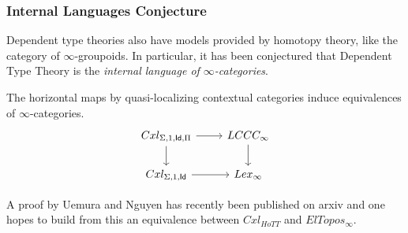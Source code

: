 \documentclass{beamer}
\DeclareMathOperator{\Id}{\mathsf{Id}}
\begin{document}
\begin{frame}
  \frametitle{Internal Languages Conjecture}

  Dependent type theories also have models provided by homotopy theory, like
  the category of $\infty$-groupoids. In
  particular, it has been conjectured that Dependent Type Theory is the
  \emph{internal language of $\infty$-categories}.

  \begin{conj}
    The horizontal maps by quasi-localizing contextual categories induce
    equivalences of $\infty$-categories.
    \[\begin{tikzcd}[ampersand replacement=\&]
      {Cxl_{\Sigma,1,\Id,\Pi}} \& {LCCC_\infty} \\
      {Cxl_{\Sigma,1,\Id}} \& {Lex_{\infty}}
      \arrow[from=1-1, to=2-1]
      \arrow[from=1-2, to=2-2]
      \arrow[from=2-1, to=2-2]
      \arrow[from=1-1, to=1-2]
    \end{tikzcd}\]
  \end{conj}

  A proof by Uemura and Nguyen has recently been published on arxiv and one
  hopes to build from this an equivalence between $Cxl_{HoTT}$ and
  $ElTopos_\infty$.
\end{frame}
\end{document}
